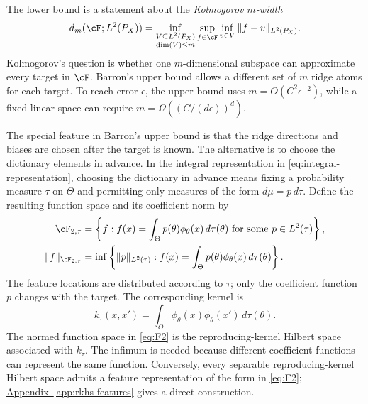 \documentclass[11pt,twoside]{article}
\newcommand{\appendixref}[1]{\hyperref[#1]{Appendix~\ref*{#1}}}
\theoremstyle{definition}
\theoremstyle{remark}
\begin{document}
The lower bound is a statement about the \emph{Kolmogorov \(m\)-width}
\begin{equation}
 d_m(\cF;L^2(P_X))
 =\inf_{\substack{V\subseteq L^2(P_X)\\ \dim(V)\leq m}}
 \sup_{f\in\cF}\inf_{v\in V}\|f-v\|_{L^2(P_X)}.
 \label{eq:kolmogorov-width}
\end{equation}
Kolmogorov's question is whether one \(m\)-dimensional subspace can
approximate every target in \(\cF\). Barron's upper bound allows a different
set of \(m\) ridge atoms for each target. To reach error \(\epsilon\), the
upper bound uses \(m=O(C^2\epsilon^{-2})\), while a fixed linear space can
require \(m=\Omega((C/(d\epsilon))^d)\).%

The special feature in Barron's upper bound is that the ridge directions and
biases are chosen after the target is known. The alternative is to choose the
dictionary elements in advance. In the integral representation in
\cref{eq:integral-representation}, choosing the dictionary in advance means
fixing a probability measure \(\tau\) on \(\Theta\) and permitting only
measures of the form \(d\mu=p\,d\tau\). Define the resulting function space and
its coefficient norm by
\begin{align}
 \cF_{2,\tau}
 &=\left\{f:f(x)=\int_\Theta p(\theta)\phi_\theta(x)\,d\tau(\theta)
              \text{ for some }p\in L^2(\tau)\right\},
 \notag\\
 \|f\|_{\cF_{2,\tau}}
 &=\inf\left\{\|p\|_{L^2(\tau)}:
       f(x)=\int_\Theta p(\theta)\phi_\theta(x)\,d\tau(\theta)\right\}.
 \label{eq:F2}
\end{align}
The feature locations are distributed according to \(\tau\); only the
coefficient function \(p\) changes with the target. The corresponding kernel
is
\begin{equation}
 k_\tau(x,x')
 =\int_\Theta\phi_\theta(x)\phi_\theta(x')\,d\tau(\theta).
 \label{eq:feature-kernel}
\end{equation}
The normed function space in \cref{eq:F2} is the reproducing-kernel Hilbert
space associated with \(k_\tau\). The infimum is needed because different
coefficient functions can represent the same function. Conversely, every
separable reproducing-kernel Hilbert space admits a feature representation of
the form in \cref{eq:F2}; \appendixref{app:rkhs-features} gives a direct construction.
\end{document}
